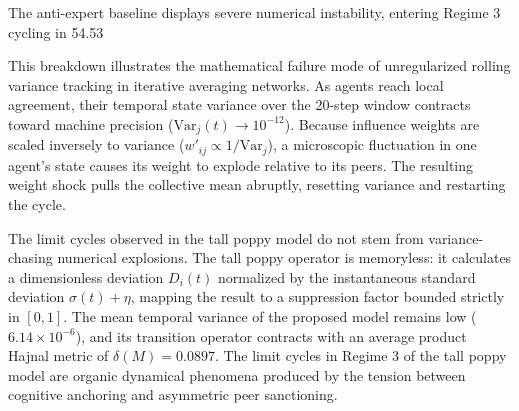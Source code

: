 The anti-expert baseline displays severe numerical instability, entering Regime 3 cycling in 54.53%

This breakdown illustrates the mathematical failure mode of unregularized rolling variance tracking in iterative averaging networks\cite{degroot1974reaching}. As agents reach local agreement, their temporal state variance over the 20-step window contracts toward machine precision ($\text{Var}_j(t) \to 10^{-12}$)\cite{degroot1974reaching}. Because influence weights are scaled inversely to variance ($w'_{ij} \propto 1/\text{Var}_j$), a microscopic fluctuation in one agent's state causes its weight to explode relative to its peers\cite{degroot1974reaching,acemoglu2013opinion}. The resulting weight shock pulls the collective mean abruptly, resetting variance and restarting the cycle\cite{degroot1974reaching}.

The limit cycles observed in the tall poppy model do not stem from variance-chasing numerical explosions\cite{degroot1974reaching}. The tall poppy operator is memoryless: it calculates a dimensionless deviation $D_i(t)$ normalized by the instantaneous standard deviation $\sigma(t) + \eta$, mapping the result to a suppression factor bounded strictly in $[0, 1]$\cite{degroot1974reaching,acemoglu2013opinion}. The mean temporal variance of the proposed model remains low ($6.14 \times 10^{-6}$), and its transition operator contracts with an average product Hajnal metric of $\delta(M) = 0.0897$\cite{acemoglu2013opinion}. The limit cycles in Regime 3 of the tall poppy model are organic dynamical phenomena produced by the tension between cognitive anchoring and asymmetric peer sanctioning\cite{degroot1974reaching,acemoglu2013opinion}.


